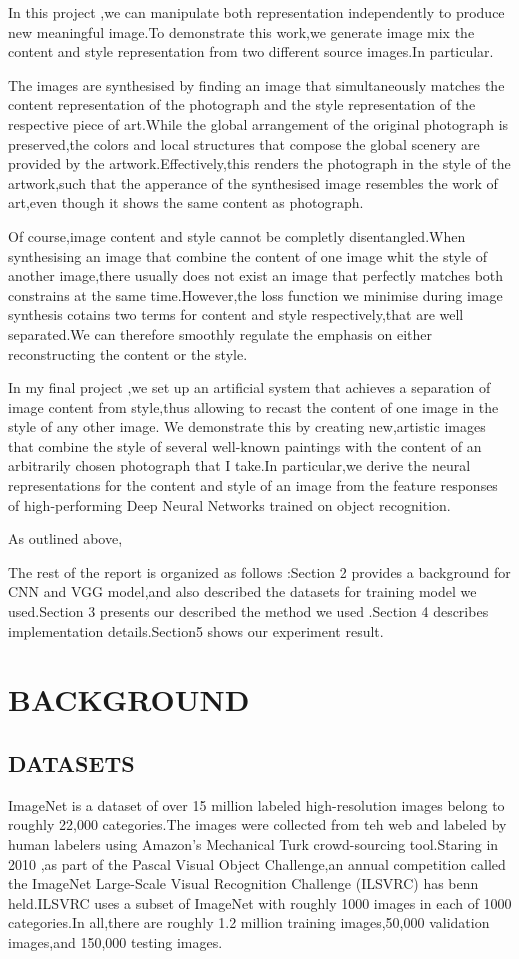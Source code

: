 \documentclass[10pt,a4paper]{ctexart}
\begin{document}
	In this project ,we can manipulate both representation independently to produce new meaningful image.To demonstrate this work,we generate image mix 
	the content and style representation from two different source images.In particular.
	
	The images are synthesised by finding an image that simultaneously matches the
	content representation of the photograph and the style representation of the
	respective piece of art.While the global arrangement of the original photograph is preserved,the colors and local structures that compose the global scenery are provided by the artwork.Effectively,this renders the photograph in the style of the artwork,such that the apperance of the synthesised image resembles the work of art,even though it shows the same content as photograph.
	
	Of course,image content and style cannot be completly disentangled.When synthesising an image that combine 
	the content of one image whit the style of another image,there usually does not exist an image that perfectly 
	matches both constrains at the same time.However,the loss function we minimise during image synthesis cotains
	two terms for content and style respectively,that are well separated.We can therefore smoothly regulate 
	the emphasis on either reconstructing the content or the style.
	
	In my final project ,we set up an artificial system that achieves a separation
	of image content from style,thus allowing to recast the content of one image in the style of any other image. We demonstrate this by creating new,artistic images that combine the style of several well-known paintings with the content of an arbitrarily chosen photograph that I take.In particular,we derive the neural representations for the content and style of an image from the feature responses of high-performing Deep Neural Networks trained 
	on object recognition.
	
	As outlined above, 
	
	The rest of the report is organized as follows :Section 2 provides a background for CNN and VGG model,and also described the datasets for training model we used.Section 3 presents our described the 
	method we used .Section 4 describes implementation details.Section5 shows our
	experiment result.
	\section{BACKGROUND}
	\subsection{DATASETS}
	ImageNet is a dataset of over 15 million labeled high-resolution images belong to roughly 22,000 categories.The images were collected from teh web and labeled by human labelers using Amazon's Mechanical Turk crowd-sourcing tool.Staring in 2010 ,as part of the Pascal Visual Object Challenge,an annual competition called the ImageNet Large-Scale Visual Recognition Challenge (ILSVRC) has benn held.ILSVRC uses a subset of ImageNet with roughly 1000
	images in each of 1000 categories.In all,there are roughly 1.2 million training images,50,000 validation images,and 150,000 testing images.
	
\end{document}
